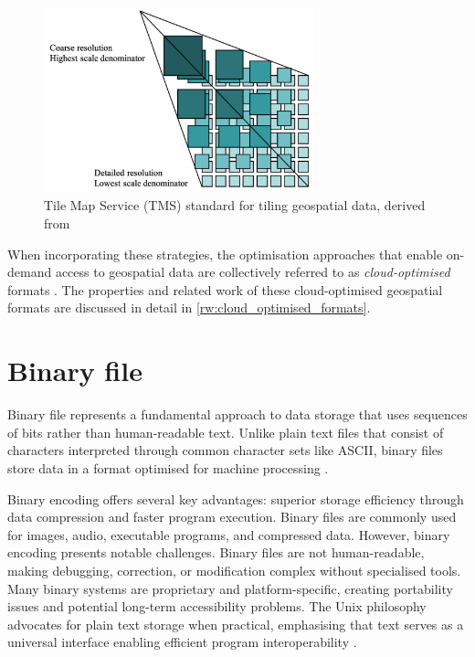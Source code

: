 \begin{figure}[ht]
  \centering
  \includegraphics[width=0.7\textwidth]{figs/related_work_theoretical_bg/tms.png}
  \caption{Tile Map Service (TMS) standard for tiling geospatial data, derived from \citet{tms}}
  \label{fig:tms}
\end{figure}

When incorporating these strategies, the optimisation approaches that enable on-demand access to geospatial data are collectively referred to as \emph{cloud-optimised} formats \citep{cloud-optimised-formats}. The properties and related work of these cloud-optimised geospatial formats are discussed in detail in \autoref{rw:cloud_optimised_formats}.

\section{Binary file}
\label{tb:binary_file}
Binary file represents a fundamental approach to data storage that uses sequences of bits rather than human-readable text. Unlike plain text files that consist of characters interpreted through common character sets like ASCII, binary files store data in a format optimised for machine processing \citep{binary_file}.

Binary encoding offers several key advantages: superior storage efficiency through data compression and faster program execution. Binary files are commonly used for images, audio, executable programs, and compressed data.
However, binary encoding presents notable challenges. Binary files are not human-readable, making debugging, correction, or modification complex without specialised tools. Many binary systems are proprietary and platform-specific, creating portability issues and potential long-term accessibility problems. The Unix philosophy advocates for plain text storage when practical, emphasising that text serves as a universal interface enabling efficient program interoperability \citep{binary_file}.

